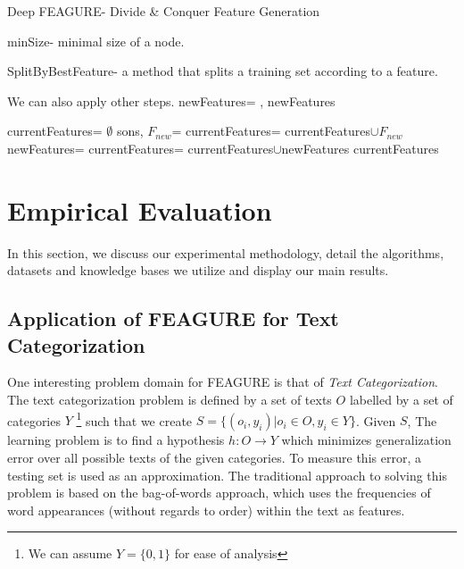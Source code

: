 \documentclass[twoside,11pt]{article}
\theoremstyle{definition}
\begin{document}
\begin{algorithm}[H]
	\caption{Deep FEAGURE- Divide \& Conquer Feature Generation}
	\label{code-tree-thing}
	\small
		minSize- minimal size of a node.

        SplitByBestFeature- a method that splits a training set according to a feature.
        
		\begin{algorithmic}
                 \Comment We can also apply other steps.
                    \State
                    \Return 
                \EndIf
                \State newFeatures=
                \State \Return {}, newFeatures
			\EndFunction

            			
			\State 
                \State currentFeatures= $\emptyset$
                \State sons, $F_{new}$=
                \State currentFeatures= currentFeatures$\cup F_{new}$
                    \State newFeatures=
                    \State currentFeatures= currentFeatures$\cup$newFeatures
                \EndFor
                \State \Return currentFeatures
			\EndFunction
		\end{algorithmic}
	\end{algorithm}


\section{Empirical Evaluation}
In this section, we discuss our experimental methodology, detail the algorithms, datasets and knowledge bases we utilize and display our main results.

\subsection{Application of FEAGURE for Text Categorization} \label{text-feagure}

One interesting problem domain for FEAGURE is that of \emph{Text Categorization}.
The text categorization problem is defined by a set of texts $O$ labelled by a set of categories $Y$ \footnote{We can assume $Y=\{0,1\}$ for ease of analysis}
such that we create $S=\{(o_i,y_i)|o_i\in O, y_i\in Y\}$. Given $S$, The learning problem is to find a hypothesis $h:O\rightarrow Y$ which minimizes generalization error over all possible texts of the given categories. To measure this error, a testing set is used as an approximation.
The traditional approach to solving this problem is based on the bag-of-words \cite{Wu:1981:CST:1013228.511759,salton1983introduction} approach, which uses the frequencies of word appearances (without regards to order) within the text as features. 
\end{document}
